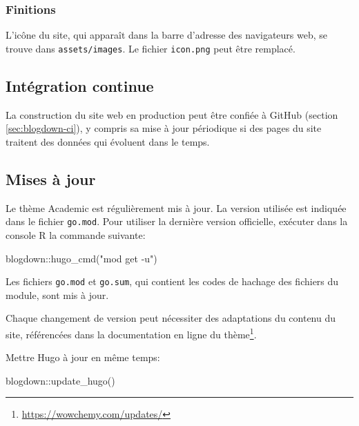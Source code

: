 \documentclass[
  11pt,
  french,
  a4paper,
  extrafontsizes,onecolumn,openright
  ]{memoir}
\newenvironment{Shaded}{\begin{snugshade}}{\end{snugshade}}
\newcommand{\FunctionTok}[1]{\textcolor[rgb]{0.00,0.00,0.00}{#1}}
\newcommand{\NormalTok}[1]{#1}
\newcommand{\SpecialCharTok}[1]{\textcolor[rgb]{0.00,0.00,0.00}{#1}}
\newcommand{\StringTok}[1]{\textcolor[rgb]{0.31,0.60,0.02}{#1}}
\begin{document}
\hypertarget{finitions-1}{%
\subsubsection{Finitions}\label{finitions-1}}

L'icône du site, qui apparaît dans la barre d'adresse des navigateurs web, se trouve dans \texttt{assets/images}.
Le fichier \texttt{icon.png} peut être remplacé.

\hypertarget{sec:rediger-web-ci}{%
\subsection{Intégration continue}\label{sec:rediger-web-ci}}

La construction du site web en production peut être confiée à GitHub (section \ref{sec:blogdown-ci}), y compris sa mise à jour périodique si des pages du site traitent des données qui évoluent dans le temps.

\hypertarget{mises-uxe0-jour-1}{%
\subsection{Mises à jour}\label{mises-uxe0-jour-1}}

Le thème Academic est régulièrement mis à jour.
La version utilisée est indiquée dans le fichier \texttt{go.mod}.
Pour utiliser la dernière version officielle, exécuter dans la console R la commande suivante:

\scriptsize

\begin{Shaded}
\begin{Highlighting}[]
\NormalTok{blogdown}\SpecialCharTok{::}\FunctionTok{hugo\_cmd}\NormalTok{(}\StringTok{"mod get {-}u"}\NormalTok{)}
\end{Highlighting}
\end{Shaded}

\normalsize

Les fichiers \texttt{go.mod} et \texttt{go.sum}, qui contient les codes de hachage des fichiers du module, sont mis à jour.

Chaque changement de version peut nécessiter des adaptations du contenu du site, référencées dans la documentation en ligne du thème\footnote{\url{https://wowchemy.com/updates/}}.

Mettre Hugo à jour en même temps:

\scriptsize

\begin{Shaded}
\begin{Highlighting}[]
\NormalTok{blogdown}\SpecialCharTok{::}\FunctionTok{update\_hugo}\NormalTok{()}
\end{Highlighting}
\end{Shaded}
\end{document}
